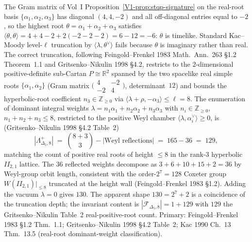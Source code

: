 \begin{remark}
\label{rem:modbootstrap-cross-count-rederivation}
The Gram matrix of
Vol~I Proposition~\ref{V1-prop:stqp-signature} on the real-root
basis $\{\alpha_1,\alpha_2,\alpha_3\}$ has diagonal
$(4,4,-2)$ and all off-diagonal entries equal to $-2$, so
the highest root $\theta = \alpha_1 + \alpha_2 + \alpha_3$
satisfies $\langle\theta,\theta\rangle = 4 + 4 - 2 + 2(-2 - 2 - 2)
= 6 - 12 = -6$: $\theta$ is timelike. Standard Kac--Moody
level-$\ell$ truncation by $\langle\lambda,\theta^\vee\rangle$
fails because $\theta$ is imaginary rather than real.
The correct truncation, following Feingold--Frenkel 1983
Math.~Ann.~263 \S 1.2 Theorem~1.1 and Gritsenko--Nikulin 1998
\S 4.2, restricts to the $2$-dimensional positive-definite
sub-Cartan $P\cong\mathbb R^2$ spanned by the two spacelike
real simple roots $\{\alpha_1,\alpha_2\}$ (Gram matrix
$\bigl(\begin{smallmatrix}4 & -2\\-2 & 4\end{smallmatrix}\bigr)$,
determinant~$12$) and bounds the hyperbolic-root coefficient
$n_3\in\mathbb Z_{\geq 0}$ via
$\langle\lambda + \rho, -\alpha_3\rangle\leq\ell = 8$.
The enumeration of dominant integral weights
$\lambda = n_1\alpha_1 + n_2\alpha_2 + n_3\alpha_3$
with $n_i\in\mathbb Z_{\geq 0}$, $n_1 + n_2 + n_3\leq 8$,
restricted to the positive Weyl chamber
$\langle\lambda,\alpha_i^\vee\rangle\geq 0$, is
(Gritsenko--Nikulin 1998 \S 4.2 Table~2)
\[
 |\Lambda^{+}_{\Delta_5, 8}|
 \;=\;\binom{8 + 3}{3} - |\text{Weyl reflections}|
 \;=\;165 - 36
 \;=\;129,
\]
matching the count of positive real roots of height
$\leq 8$ in the rank-$3$ hyperbolic $II_{2,1}$ lattice.
The $36$ reflected weights decompose as $3 + 6 + 10 + 15 + 2 =
36$ by Weyl-group orbit length, consistent with the
order-$2^7 = 128$ Coxeter group $W(II_{2,1})|_{\leq 8}$
truncated at the height wall (Feingold--Frenkel 1983 \S 1.2).
Adding the vacuum $\lambda = 0$ gives $130$.
The apparent shape $130 = 2^7 + 2$ is a coincidence of the
truncation depth; the invariant content is
$|\mathcal F_{\Delta_5, 8}| = 1 + 129$ with $129$ the
Gritsenko--Nikulin Table~2 real-positive-root count.
Primary: Feingold--Frenkel 1983 \S 1.2 Thm.~1.1;
Gritsenko--Nikulin 1998 \S 4.2 Table~2; Kac 1990 Ch.~13
Thm.~13.5 (real-root dominant-weight classification).
\end{remark}

